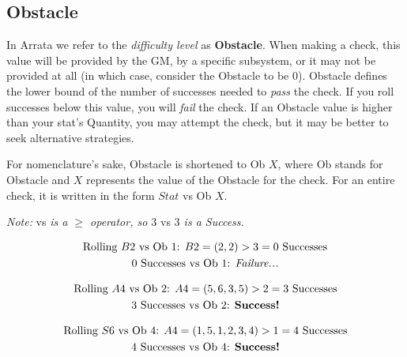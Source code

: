 \documentclass[../main.tex]{subfiles}
\begin{document}
    \subsection{Obstacle}

    In Arrata we refer to the {\em difficulty level} as \textbf{Obstacle}. When making a check, this value will be provided by the GM, by a specific subsystem, or it may not be provided at all (in which case, consider the Obstacle to be 0). Obstacle defines the lower bound of the number of successes needed to {\em pass} the check. If you roll successes below this value, you will {\em fail} the check. If an Obstacle value is higher than your stat's Quantity, you may attempt the check, but it may be better to seek alternative strategies.

    For nomenclature's sake, Obstacle is shortened to Ob $X$, where Ob stands for Obstacle and $X$ represents the value of the Obstacle for the check. For an entire check, it is written in the form $Stat$ vs Ob $X$.

    \emph{Note: }vs\emph{ is a $\geq$ operator, so $3$ }vs\emph{ $3$ is a Success.}
    \begin{mdframed}[style=Arrata]
        \begin{equation*}
            \begin{gathered}
                \text{Rolling $B2$ vs Ob 1: }                      
                B2 = (2, 2)>3 = 0 \text{ Successes}               \\
                \text{0 Successes vs Ob 1: \emph{Failure...}}
            \end{gathered}
        \end{equation*}

        \begin{equation*}
            \begin{gathered}
                \text{Rolling $A4$ vs Ob 2: }                      
                A4 = (5, 6, 3, 5)>2 = 3 \text{ Successes}         \\
                \text{3 Successes vs Ob 2: \textbf{Success!}}
            \end{gathered}
        \end{equation*}

        \begin{equation*}
            \begin{gathered}
                \text{Rolling $S6$ vs Ob 4: }                      
                A4 = (1, 5, 1, 2, 3, 4)>1 = 4 \text{ Successes}   \\
                \text{4 Successes vs Ob 4: \textbf{Success!}}
            \end{gathered}
        \end{equation*}
    \end{mdframed}
\end{document}
